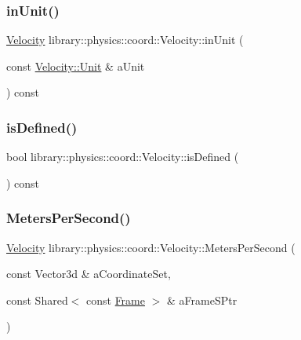 \mbox{\label{classlibrary_1_1physics_1_1coord_1_1_velocity_a814e6740d6b54cf5421d9aa7fc0f5958}} 
\subsubsection{\texorpdfstring{in\+Unit()}{inUnit()}}
{\footnotesize\ttfamily \hyperlink{classlibrary_1_1physics_1_1coord_1_1_velocity}{Velocity} library\+::physics\+::coord\+::\+Velocity\+::in\+Unit (\begin{DoxyParamCaption}\item[{const \hyperlink{classlibrary_1_1physics_1_1coord_1_1_velocity_a8bbc811932c454dbe0ab8b56f1b2c0b3}{Velocity\+::\+Unit} \&}]{a\+Unit }\end{DoxyParamCaption}) const}

\mbox{\label{classlibrary_1_1physics_1_1coord_1_1_velocity_a5487f6d50e13d2262bf0726ed8536c99}} 
\subsubsection{\texorpdfstring{is\+Defined()}{isDefined()}}
{\footnotesize\ttfamily bool library\+::physics\+::coord\+::\+Velocity\+::is\+Defined (\begin{DoxyParamCaption}{ }\end{DoxyParamCaption}) const}

\mbox{\label{classlibrary_1_1physics_1_1coord_1_1_velocity_aca486d66f18e8fab83d45c3b52bb9324}} 
\subsubsection{\texorpdfstring{Meters\+Per\+Second()}{MetersPerSecond()}}
{\footnotesize\ttfamily \hyperlink{classlibrary_1_1physics_1_1coord_1_1_velocity}{Velocity} library\+::physics\+::coord\+::\+Velocity\+::\+Meters\+Per\+Second (\begin{DoxyParamCaption}\item[{const Vector3d \&}]{a\+Coordinate\+Set,  }\item[{const Shared$<$ const \hyperlink{classlibrary_1_1physics_1_1coord_1_1_frame}{Frame} $>$ \&}]{a\+Frame\+S\+Ptr }\end{DoxyParamCaption})\hspace{0.3cm}{\ttfamily [static]}}

